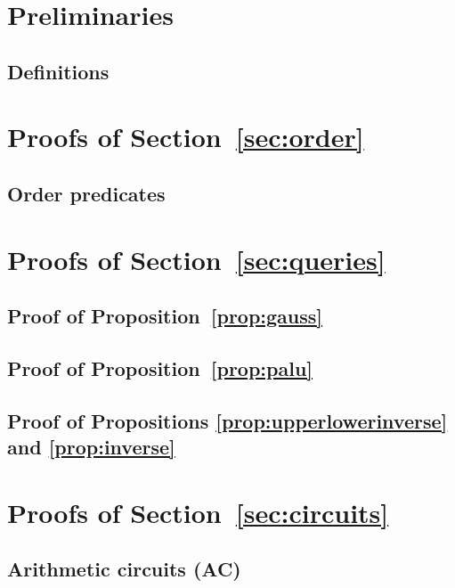 
\section{Preliminaries}

\subsection{Definitions}



\section{Proofs of Section~\ref{sec:order}}

\subsection{Order predicates}\label{app:order}



\section{Proofs of Section~\ref{sec:queries}}

\subsection{Proof of Proposition~\ref{prop:gauss}}


\subsection{Proof of Proposition~\ref{prop:palu}}


\subsection{Proof of Propositions \ref{prop:upperlowerinverse} and \ref{prop:inverse}}



\section{Proofs of Section~\ref{sec:circuits}}

\subsection{Arithmetic circuits (AC)}


